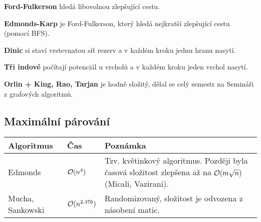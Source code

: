 \begin{itemize*}
\item \textbf{Ford-Fulkerson} hledá libovolnou zlepšující cestu. 
\item \textbf{Edmonds-Karp} je Ford-Fulkerson, který hledá nejkratší
zlepšující cestu (pomocí BFS). 
\item \textbf{Dinic} si staví vrstevnatou síť rezerv a v každém kroku jednu
hranu nasytí. 
\item \textbf{Tři indové} počítají potenciál u vrcholů a v každém kroku
jeden vrchol nasytí. 
\item \textbf{Orlin + King, Rao, Tarjan} je hodně složitý, dělal se celý
semestr na Semináři z grafových algoritmů.
\end{itemize*}

\subsection{Maximální párování}

\begin{center}
\begin{tabular}{ l l p{10cm} }
	\hline
	\bf Algoritmus & \bf Čas & \bf Poznámka \\
	\hline
	Edmonds & $\mathcal{O}(n^4)$ & Tzv. květinkový algoritmus. Později byla časová složitost zlepšena až na $\mathcal{O}(m\sqrt n)$ (Micali, Vazirani). \\
	Mucha, Sankowski & $\mathcal{O}(n^{2.376})$ & Randomizovaný, složitost je odvozena z násobení matic. \\
	\hline
\end{tabular}
\end{center}


\renewcommand{\arraystretch}{1.0}

